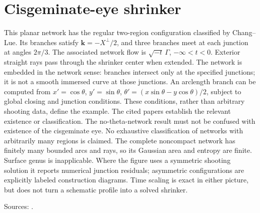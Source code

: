\chapter{Cisgeminate-eye shrinker}\label{sec:catalogue-network-cisgeminate-eye}
\begin{example}\label{ex:catalogue-network-cisgeminate-eye}
This planar network has the regular two-region configuration classified by Chang–Lue. Its branches satisfy $\mathbf k=-X^\perp/2$, and three branches meet at each junction at angles $2\pi/3$. The associated network flow is $\sqrt{-t}\,\Gamma$, $-\infty<t<0$. Exterior straight rays pass through the shrinker center when extended. The network is embedded in the network sense: branches intersect only at the specified junctions; it is not a smooth immersed curve at those junctions.
An arclength branch can be computed from $x'=\cos\theta$, $y'=\sin\theta$, $\theta'=(x\sin\theta-y\cos\theta)/2$, subject to global closing and junction conditions. These conditions, rather than arbitrary shooting data, define the example. The cited papers establish the relevant existence or classification. The no-theta-network result must not be confused with existence of the cisgeminate eye. No exhaustive classification of networks with arbitrarily many regions is claimed.
The complete noncompact network has finitely many bounded arcs and rays, so its Gaussian area and entropy are finite. Surface genus is inapplicable. Where the figure uses a symmetric shooting solution it reports numerical junction residuals; asymmetric configurations are explicitly labeled construction diagrams. Time scaling is exact in either picture, but does not turn a schematic profile into a solved shrinker.
\par Sources: \cite{CatChangLue2019}.
\end{example}

